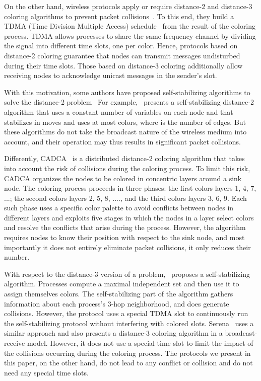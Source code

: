 \documentclass[11pt,english]{article}
\begin{document}
On the other hand, wireless protocols apply or require distance-2 and
distance-3 coloring algorithms to prevent packet
collisions~\cite{chipara11:conflict}. To this end, they build a TDMA
(Time Division Multiple Access) schedule~\cite{R97} from the result of
the coloring process.  TDMA allows processes to share the same
frequency channel by dividing the signal into different time slots,
one per color. Hence, protocols based on distance-2 coloring guarantee
that nodes can transmit messages undisturbed during their time
slots. Those based on distance-3 coloring additionally allow receiving
nodes to acknowledge unicast messages in the sender's slot.



With this motivation, some authors have proposed self-stabilizing
algorithms to solve the distance-2
problem~\cite{BM09,gairing-distanceTwo} For example,~\cite{BM09}
presents a self-stabilizing distance-2 algorithm that uses a constant
number of variables on each node and that stabilizes in  moves and uses at most  colors, where  is the number
of edges. But these algorithms do not take the broadcast nature of the
wireless medium into account, and their operation may thus results in
significant packet collisions. 

Differently, CADCA~\cite{jemili13:collision} is a distributed distance-2
coloring algorithm that takes into account the risk of collisions
during the coloring process. To limit this risk, CADCA organizes the
nodes to be colored in concentric layers around a sink node. The
coloring process proceeds in three phases: the first colors layers 1,
4, 7, ...; the second colors layers 2, 5, 8, ...., and the third
colors layers 3, 6, 9. Each such phase uses a specific color palette
to avoid conflicts between nodes in different layers and exploits five
stages in which the nodes in a layer select colors and resolve the
conflicts that arise during the process. However, the algorithm
requires nodes to know their position with respect to the sink node,
and most importantly it does not entirely eliminate packet collisions,
it only reduces their number. 


With respect to the distance-3 version of a problem,~\cite{HT04}
proposes a self-stabilizing algorithm. Processes compute a maximal
independent set and then use it to assign themselves colors. The
self-stabilizing part of the algorithm gathers information about each
process's 3-hop neighborhood, and does generate collisions. However,
the protocol uses a special TDMA slot to continuously run the
self-stabilizing protocol without interfering with colored slots.
Serena~\cite{serena} uses a similar approach and also presents a
distance-3 coloring algorithm in a broadcast-receive model. However,
it does not  use a special time-slot to limit the impact of the
collisions occurring during the coloring process.  The protocols we
present in this paper, on the other hand, do not lead to any conflict
or collision and do not need any special time slots.
\end{document}
